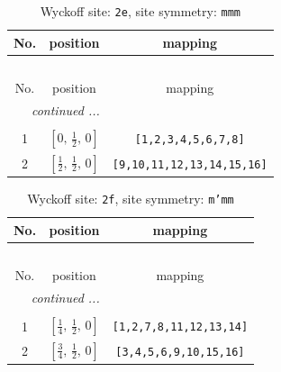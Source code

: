 \documentclass[fleqn,8pt]{jsarticle}
\begin{document}
\begin{longtable}{ccc}
\caption{Wyckoff site: {\tt 2e}, site symmetry: {\tt mmm}}
 \\
 \hline \hline
No. & position & mapping \\ \hline \endfirsthead

\multicolumn{2}{l}{\tablename\ \thetable{}} \\
 \hline \hline
No. & position & mapping \\ \hline \endhead

 \hline \hline
\multicolumn{2}{r}{\footnotesize\it continued ...} \\ \endfoot

 \hline \hline
\multicolumn{2}{r}{} \\ \endlastfoot

1 & $\left[ 0,\, \frac{1}{2},\, 0 \right]$ & {\tt [1,2,3,4,5,6,7,8]} \\ \hline
2 & $\left[ \frac{1}{2},\, \frac{1}{2},\, 0 \right]$ & {\tt [9,10,11,12,13,14,15,16]} \\
\end{longtable}
\renewcommand{\arraystretch}{1.2}
\begin{longtable}{ccc}
\caption{Wyckoff site: {\tt 2f}, site symmetry: {\tt m'mm}}
 \\
 \hline \hline
No. & position & mapping \\ \hline \endfirsthead

\multicolumn{2}{l}{\tablename\ \thetable{}} \\
 \hline \hline
No. & position & mapping \\ \hline \endhead

 \hline \hline
\multicolumn{2}{r}{\footnotesize\it continued ...} \\ \endfoot

 \hline \hline
\multicolumn{2}{r}{} \\ \endlastfoot

1 & $\left[ \frac{1}{4},\, \frac{1}{2},\, 0 \right]$ & {\tt [1,2,7,8,11,12,13,14]} \\ \hline
2 & $\left[ \frac{3}{4},\, \frac{1}{2},\, 0 \right]$ & {\tt [3,4,5,6,9,10,15,16]} \\
\end{longtable}
\renewcommand{\arraystretch}{1.2}
\end{document}
